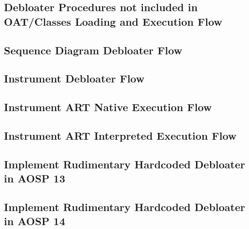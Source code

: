 \subsection{Debloater Procedures not included in OAT/Classes Loading and Execution Flow}

\subsection{Sequence Diagram Debloater Flow}

\subsection{Instrument Debloater Flow}

\subsection{Instrument ART Native Execution Flow}

\subsection{Instrument ART Interpreted Execution Flow}

\subsection{Implement Rudimentary Hardcoded Debloater in AOSP 13}

\subsection{Implement Rudimentary Hardcoded Debloater in AOSP 14}


% 


